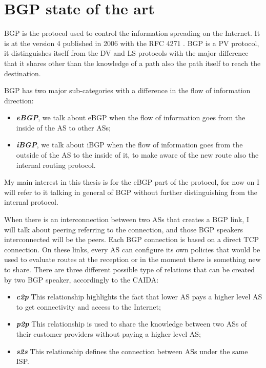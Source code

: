 \chapter{BGP state of the art}
\label{cha:bgp_art}

\ac{BGP} is the protocol used to control the information spreading on the Internet.
It is at the version \num{4} published in \num{2006} with the \ac{RFC} \num{4271}
\cite{rfc4271}.
\ac{BGP} is a \ac{PV} protocol, it distinguishes itself from the \ac{DV} and \ac{LS}
protocols with the major difference that it shares other than the knowledge of
a path also the path itself to reach the destination.

\ac{BGP} has two major sub-categories with a difference in the flow of information
direction:
\begin{itemize}
	\item \textbf{\textit{\ac{eBGP}}}, we talk about \ac{eBGP} when the
		flow of information goes from the inside
		of the \ac{AS} to other \acp{AS};
	\item \textbf{\textit{\ac{iBGP}}}, we talk about \ac{iBGP} when the flow
		of information goes from the outside of the \ac{AS} to the inside of
		it, to make aware of the new route also the internal routing protocol.
\end{itemize}

My main interest in this thesis is for the \ac{eBGP} part of the protocol, for
now on I will refer to it talking in general of \ac{BGP} without further distinguishing
from the internal protocol.

When there is an interconnection between two \acp{AS} that creates a \ac{BGP}
link, I will talk about peering referring to the connection, and those \ac{BGP} 
speakers interconnected will be the peers.
Each \ac{BGP} connection is based on a direct \ac{TCP} connection.
On these links, every \ac{AS} can configure its own policies that would be used
to evaluate routes at the reception or in the moment there is something new 
to share.
There are three different possible type of relations that can be created by two
\ac{BGP} speaker, accordingly to the \ac{CAIDA}:

\begin{itemize}
	\item \textbf{\textit{\ac{c2p}}} This relationship highlights the fact that
		lower \ac{AS} pays a higher level \ac{AS} to get connectivity and access
		to the Internet;
	\item \textbf{\textit{\ac{p2p}}} This relationship is used to share the knowledge
		between two \acp{AS} of their customer providers without paying a higher
		level \ac{AS};
	\item \textbf{\textit{\ac{s2s}}} This relationship defines the connection 
		between \acp{AS} under the same \ac{ISP}.
\end{itemize}

